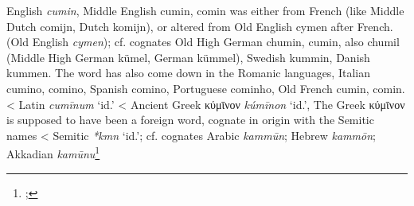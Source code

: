 \begin{etymology}\label{ety:cumin}
English \textit{cumin}, Middle English cumin, comin was either from French (like Middle Dutch comijn, Dutch komijn), or altered from Old English cymen after French. (Old English \textit{cymen}); cf. cognates Old High German chumin, cumin, also chumil (Middle High German kümel, German kümmel), Swedish kummin, Danish kummen. The word has also come down in the Romanic languages, Italian cumino, comino, Spanish comino, Portuguese cominho, Old French cumin, comin. 
< Latin \textit{cumīnum} `id.'
< Ancient Greek {κύμῑνον} \textit{kúmīnon} `id.', The Greek κύμῑνον is supposed to have been a foreign word, cognate in origin with the Semitic names
< Semitic \textit{*kmn} `id.'; cf. cognates Arabic \textit{kammūn}; Hebrew \textit{kammōn}; Akkadian \textit{kamūnu}\footnote{\textcite[s.v. cumin]{oed}; }
\end{etymology}